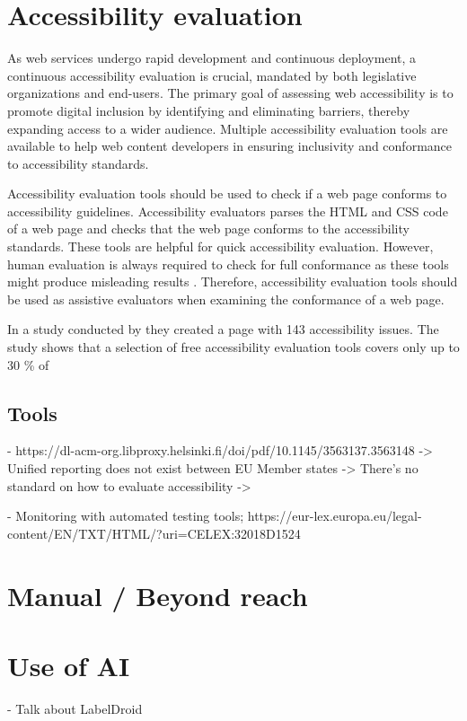 

\section{Accessibility evaluation}

As web services undergo rapid development and continuous deployment, a continuous accessibility evaluation is crucial, mandated by both legislative organizations and end-users. The primary goal of assessing web accessibility is to promote digital inclusion by identifying and eliminating barriers, thereby expanding access to a wider audience. Multiple accessibility evaluation tools are available to help web content developers in ensuring inclusivity and conformance to accessibility standards.

Accessibility evaluation tools should be used to check if a web page conforms to accessibility guidelines. Accessibility evaluators parses the HTML and CSS code of a web page and checks that the web page conforms to the accessibility standards. These tools are helpful for quick accessibility evaluation. However, human evaluation is always required to check for full conformance as these tools might produce misleading results \citep{wcagevaluationtools}. Therefore, accessibility evaluation tools should be used as assistive evaluators when examining the conformance of a web page.

In a study conducted by \cite{govukaccessibility} they created a page with 143 accessibility issues. The study shows that a selection of free accessibility evaluation tools covers only up to 30 \% of 

\subsection{Tools}

- https://dl-acm-org.libproxy.helsinki.fi/doi/pdf/10.1145/3563137.3563148
-> Unified reporting does not exist between EU Member states
-> There's no standard on how to evaluate accessibility
-> 

- Monitoring with automated testing tools; https://eur-lex.europa.eu/legal-content/EN/TXT/HTML/?uri=CELEX:32018D1524

\section{Manual / Beyond reach}


\section{Use of AI}

- Talk about LabelDroid